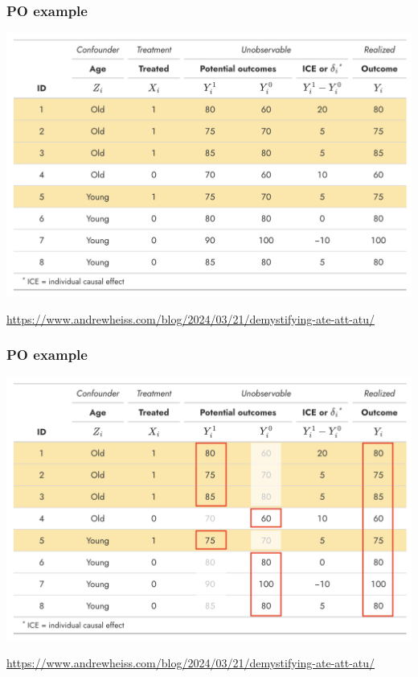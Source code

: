 \documentclass[aspectratio=43]{beamer}
\begin{document}
\begin{frame}
\frametitle{PO example}
\centering

\includegraphics[width = \textwidth]{../img/po_table}

\href{https://www.andrewheiss.com/blog/2024/03/21/demystifying-ate-att-atu/}{\footnotesize https://www.andrewheiss.com/blog/2024/03/21/demystifying-ate-att-atu/}
  

\end{frame}

\begin{frame}
\frametitle{PO example}
\centering

\includegraphics[width = \textwidth]{../img/po_table2}

\href{https://www.andrewheiss.com/blog/2024/03/21/demystifying-ate-att-atu/}{\footnotesize https://www.andrewheiss.com/blog/2024/03/21/demystifying-ate-att-atu/}
  

\end{frame}
\end{document}
